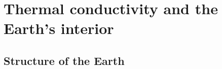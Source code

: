 \chapter{Thermal conductivity and the Earth's interior} %

\label{Chapter1} %







\section{Structure of the Earth}
\label{sec:earth_structure}

